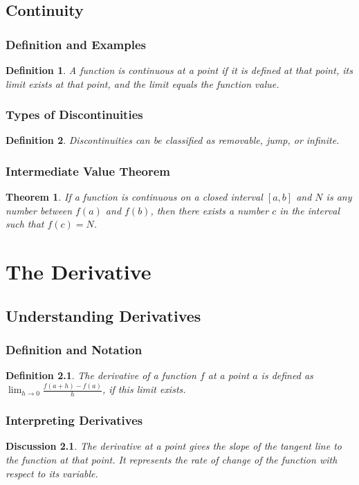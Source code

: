 \documentclass[a4paper,12pt]{book}
\newtheorem{theorem}{Theorem}
\newtheorem{definition}{Definition}
\newtheorem{discussion}{Discussion}
\begin{document}
\section{Continuity}
\subsection{Definition and Examples}
\begin{definition}
A function is continuous at a point if it is defined at that point, its limit exists at that point, and the limit equals the function value.
\end{definition}

\subsection{Types of Discontinuities}
\begin{definition}
Discontinuities can be classified as removable, jump, or infinite.
\end{definition}

\subsection{Intermediate Value Theorem}
\begin{theorem}
If a function is continuous on a closed interval \([a, b]\) and \( N \) is any number between \( f(a) \) and \( f(b) \), then there exists a number \( c \) in the interval such that \( f(c) = N \).
\end{theorem}

\chapter{The Derivative}
\section{Understanding Derivatives}
\subsection{Definition and Notation}
\begin{definition}
The derivative of a function \( f \) at a point \( a \) is defined as \(\lim_{h \to 0} \frac{f(a+h) - f(a)}{h}\), if this limit exists.
\end{definition}

\subsection{Interpreting Derivatives}
\begin{discussion}
The derivative at a point gives the slope of the tangent line to the function at that point. It represents the rate of change of the function with respect to its variable.
\end{discussion}
\end{document}
